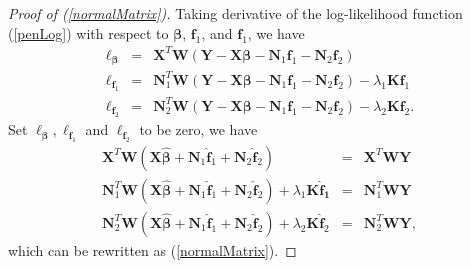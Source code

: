 \documentclass[review]{elsarticle}
\begin{document}
%
%
\appendix 

\section{}\label{app1}
%
%
%
\begin{proof}[Proof of (\ref{normalMatrix})]
Taking derivative of the log-likelihood function (\ref{penLog}) with respect to $\bm \beta$, $\bm f_1$, and $\bm f_1$, we have
\begin{eqnarray*}
\ell_{\bm \beta} &=&\boldsymbol X^T  \boldsymbol W
(\boldsymbol Y - \boldsymbol X \boldsymbol \beta 
- \boldsymbol N_1 \boldsymbol f_1 -
\boldsymbol N_2 \boldsymbol f_2) \\
\ell_{\bm f_1}
&=&
\boldsymbol N_1^T  \boldsymbol W
(\boldsymbol Y - \boldsymbol X \boldsymbol \beta - \boldsymbol N_1 \boldsymbol f_1 -
\boldsymbol N_2 \boldsymbol f_2)
- \lambda_1 \bm K \bm f_1 \\
\ell_{\boldsymbol f_2} 
&=& 
\boldsymbol N_2^T  \boldsymbol W
(\boldsymbol Y - \boldsymbol X \boldsymbol \beta - \boldsymbol N_1 \boldsymbol f_1 -
\boldsymbol N_2 \boldsymbol f_2)
- \lambda_2 \boldsymbol K  \boldsymbol f_2.
\end{eqnarray*}
Set $\ell_{\bm \beta}, \ell_{\bm f_1}$ and $\ell_{\bm f_2}$ to be zero, we have 
\begin{eqnarray}
\boldsymbol X^T  \boldsymbol W
(\boldsymbol X \boldsymbol {\hat \beta} 
+  \boldsymbol N_1 \boldsymbol {\hat f}_1
+  \boldsymbol N_2 \boldsymbol {\hat f}_2)
&=&  \boldsymbol X^T  \boldsymbol W \boldsymbol Y 
\label{normal_beta} \\
\boldsymbol N_1^T  \boldsymbol W
(\boldsymbol X \boldsymbol {\hat \beta} +  \boldsymbol N_1 \boldsymbol {\hat f}_1 
+ \boldsymbol N_2 \boldsymbol {\hat f}_2) 
+ \lambda_1 \boldsymbol K \boldsymbol {\hat f_1}
&=&
\boldsymbol N_1^T  \boldsymbol W \boldsymbol Y  
\label{normal_f1} \\
\boldsymbol N_2^T  \boldsymbol W
(\boldsymbol X \boldsymbol {\hat \beta} +  \boldsymbol N_1 \boldsymbol {\hat f}_1 
+ \boldsymbol N_2 \boldsymbol {\hat f}_2) 
+
\lambda_2 \boldsymbol K\boldsymbol {\hat f}_2
&=&  
\boldsymbol N_2^T  \boldsymbol W \boldsymbol Y,
 \label{normal_f2} 
\end{eqnarray}
which can be rewritten as (\ref{normalMatrix}).
\end{proof}
\end{document}
